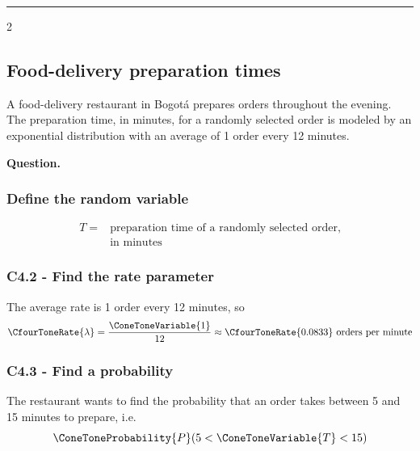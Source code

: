 \noindent\rule{\textwidth}{0.4pt}

\begin{multicols}{2}
	
	\subsection{Food-delivery preparation times}\label{sec:c4-probability-preparation}
	
	A food-delivery restaurant in Bogotá prepares orders throughout the
	evening. The preparation time, in minutes, for a randomly selected
	order is modeled by an exponential distribution with an average
	of 1 order every 12 minutes.
	
	\textbf{Question.}
	\begin{enumerate}
	\end{enumerate}
	
	\subsubsection*{Define the random variable}\label{subsec:c4-probability-preparation-a}
	
	\[
	\boxed{
		\begin{aligned}
			T={}&\text{preparation time of a randomly selected order,}\\
			&\text{in minutes}
	\end{aligned}}
	\]
	
	\subsubsection*{C4.2 - Find the rate parameter}\label{subsec:c4-probability-preparation-rate}
	
	The average rate is 1 order every 12 minutes, so
	\[
	\CfourToneRate{\lambda}=\frac{\ConeToneVariable{1}}{12}\approx\CfourToneRate{0.0833}\text{ orders per minute}
	\]
	
	\columnbreak
	
	\subsubsection*{C4.3 - Find a probability}\label{subsec:c4-probability-preparation-b}
	
	The restaurant wants to find the probability that an order takes
	between 5 and 15 minutes to prepare, i.e.
	\[
	\ConeToneProbability{P}(5<\ConeToneVariable{T}<15)
	\]
	

\end{multicols}

